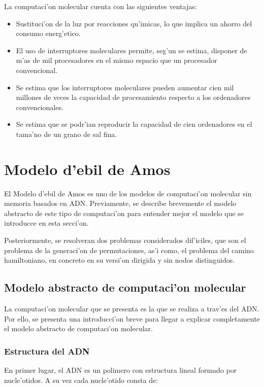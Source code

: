 \documentclass[12pt]{article}
\begin{document}
La computaci'on molecular cuenta con las siguientes ventajas:

\begin{itemize}
	\item Sustituci'on de la luz por reacciones qu'imicas, lo que implica un ahorro del consumo energ'etico.
	\item El uso de interruptores moleculares permite, seg'un se estima, disponer de m'as de mil procesadores
    en el mismo espacio que un procesador convencional.
	\item Se estima que los interruptores moleculares pueden aumentar cien mil millones de veces la capacidad
    de procesamiento respecto a los ordenadores convencionales.
	\item Se estima que se podr'ian reproducir la capacidad de cien ordenadores en el tama'no de un grano de sal fina.
\end{itemize}

\section{Modelo d'ebil de Amos}

El Modelo d'ebil de Amos es uno de los modelos de computaci'on molecular sin memoria basados en ADN.
Previamente, se describe brevemente el modelo abstracto de este tipo de computaci'on para entender mejor
el modelo que se introducce en esta secci'on.

Posteriormente, se resolveran dos problemas considerados dif'iciles, que son el problema de la generaci'on de
permutaciones, as'i como, el problema del camino hamiltoniano, en concreto en su versi'on dirigida
y sin nodos distinguidos.

\subsection{Modelo abstracto de computaci'on molecular}

La computaci'on molecular que se presenta es la que se realiza a trav'es del ADN. Por ello, se presenta una
introducci'on breve para llegar a explicar completamente el modelo abstracto de computaci'on molecular.

\subsubsection{Estructura del ADN}

En primer lugar, el ADN es un polimero con estructura lineal formado por nucle'otidos. A su vez cada
nucle'otido consta de:
\end{document}
